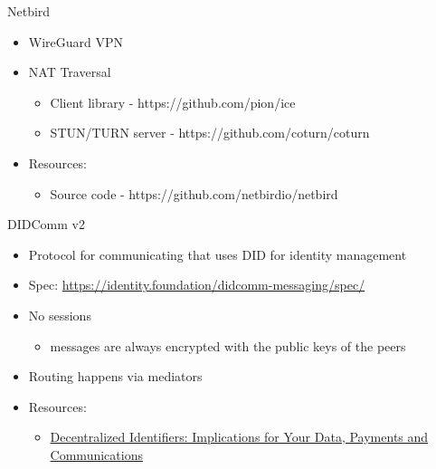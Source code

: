 \label{notes__02059-netbird.md}
\begin{block}{Netbird}
\label{notes__02059-netbird.md__netbird}
\begin{itemize}
\tightlist
\item
  WireGuard VPN
\item
  NAT Traversal

  \begin{itemize}
  \tightlist
  \item
    Client library - https://github.com/pion/ice
  \item
    STUN/TURN server - https://github.com/coturn/coturn
  \end{itemize}
\item
  Resources:

  \begin{itemize}
  \tightlist
  \item
    Source code - https://github.com/netbirdio/netbird
  \end{itemize}
\end{itemize}
\end{block}

\label{notes__02090-didcomm.md}
\begin{block}{DIDComm v2}
\label{notes__02090-didcomm.md__didcomm-v2}
\begin{itemize}
\tightlist
\item
  Protocol for communicating that uses DID for identity management
\item
  Spec: \url{https://identity.foundation/didcomm-messaging/spec/}
\item
  No sessions

  \begin{itemize}
  \tightlist
  \item
    messages are always encrypted with the public keys of the peers
  \end{itemize}
\item
  Routing happens via mediators
\item
  Resources:

  \begin{itemize}
  \tightlist
  \item
    \href{https://newsletter.impervious.ai/decentralized-identifiers-implications-for-your-data-payments-and-communications-2/}{Decentralized Identifiers: Implications for Your Data, Payments and Communications}
  \end{itemize}
\end{itemize}
\end{block}

